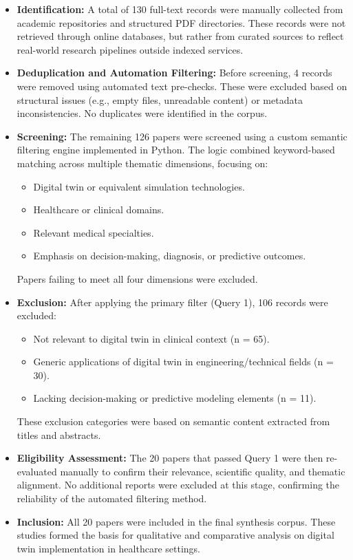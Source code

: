 \documentclass[10pt,a4paper]{article}
\begin{document}
\begin{itemize}
    \item \textbf{Identification:} A total of 130 full-text records were manually collected from academic repositories and structured PDF directories. These records were not retrieved through online databases, but rather from curated sources to reflect real-world research pipelines outside indexed services.
    
    \item \textbf{Deduplication and Automation Filtering:} Before screening, 4 records were removed using automated text pre-checks. These were excluded based on structural issues (e.g., empty files, unreadable content) or metadata inconsistencies. No duplicates were identified in the corpus.
    
    \item \textbf{Screening:} The remaining 126 papers were screened using a custom semantic filtering engine implemented in Python. The logic combined keyword-based matching across multiple thematic dimensions, focusing on:
    \begin{itemize}
        \item Digital twin or equivalent simulation technologies.
        \item Healthcare or clinical domains.
        \item Relevant medical specialties.
        \item Emphasis on decision-making, diagnosis, or predictive outcomes.
    \end{itemize}
    Papers failing to meet all four dimensions were excluded.
    
    \item \textbf{Exclusion:} After applying the primary filter (Query 1), 106 records were excluded:
    \begin{itemize}
        \item Not relevant to digital twin in clinical context (n = 65).
        \item Generic applications of digital twin in engineering/technical fields (n = 30).
        \item Lacking decision-making or predictive modeling elements (n = 11).
    \end{itemize}
    These exclusion categories were based on semantic content extracted from titles and abstracts.
    
    \item \textbf{Eligibility Assessment:} The 20 papers that passed Query 1 were then re-evaluated manually to confirm their relevance, scientific quality, and thematic alignment. No additional reports were excluded at this stage, confirming the reliability of the automated filtering method.
    
    \item \textbf{Inclusion:} All 20 papers were included in the final synthesis corpus. These studies formed the basis for qualitative and comparative analysis on digital twin implementation in healthcare settings.
\end{itemize}
\end{document}
